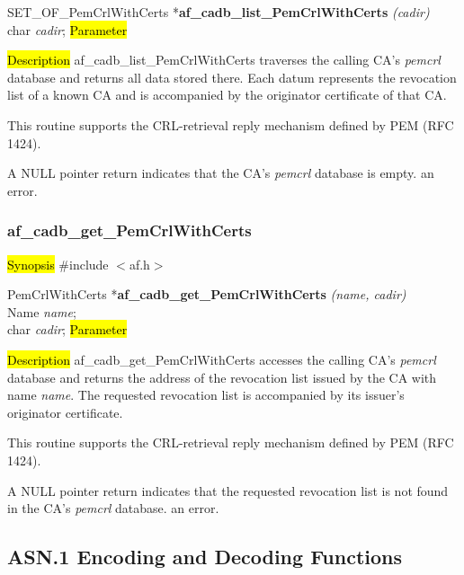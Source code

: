 SET\_OF\_PemCrlWithCerts *{\bf af\_cadb\_list\_PemCrlWithCerts} {\em (cadir)} \\
char	{\em *cadir};
\hl{Parameter}

\hl{Description}
af\_cadb\_list\_PemCrlWithCerts traverses the calling CA's {\em pemcrl} database and returns all data
stored there. Each datum represents the revocation list of a known CA and is accompanied by
the originator certificate of that CA.

This routine supports the CRL-retrieval reply mechanism defined by PEM (RFC 1424).

A NULL pointer return indicates
\bi
\m that the CA's {\em pemcrl} database is empty.
\m an error.
\ei




\subsubsection{af\_cadb\_get\_PemCrlWithCerts}
\label{af_cadb_get_PemCrlWithCerts}
\hl{Synopsis}
\#include $<$af.h$>$

PemCrlWithCerts *{\bf af\_cadb\_get\_PemCrlWithCerts} {\em (name, cadir)} \\
Name	{\em *name}; \\
char	{\em *cadir};
\hl{Parameter}


\hl{Description}
af\_cadb\_get\_PemCrlWithCerts accesses the calling CA's {\em pemcrl} database and returns the 
address of the revocation list issued by the CA with name {\em name}. The requested revocation list
is accompanied by its issuer's originator certificate.

This routine supports the CRL-retrieval reply mechanism defined by PEM (RFC 1424).

A NULL pointer return indicates
\bi
\m that the requested revocation list is not found in the CA's {\em pemcrl} database.
\m an error.
\ei


\subsection{ASN.1 Encoding and Decoding Functions}
\label{Encoding-/Decoding-Routinen}

